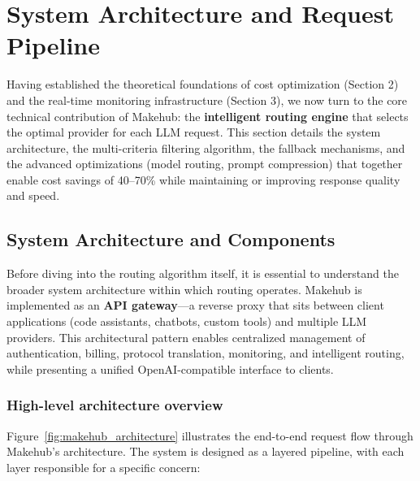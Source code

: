 \documentclass[english]{article}
\begin{document}
\newpage

\section{System Architecture and Request Pipeline}

Having established the theoretical foundations of cost optimization (Section 2) and the real-time monitoring infrastructure (Section 3), we now turn to the core technical contribution of Makehub: the \textbf{intelligent routing engine} that selects the optimal provider for each LLM request. This section details the system architecture, the multi-criteria filtering algorithm, the fallback mechanisms, and the advanced optimizations (model routing, prompt compression) that together enable cost savings of 40--70\% while maintaining or improving response quality and speed.

\subsection{System Architecture and Components}

Before diving into the routing algorithm itself, it is essential to understand the broader system architecture within which routing operates. Makehub is implemented as an \textbf{API gateway}—a reverse proxy that sits between client applications (code assistants, chatbots, custom tools) and multiple LLM providers. This architectural pattern enables centralized management of authentication, billing, protocol translation, monitoring, and intelligent routing, while presenting a unified OpenAI-compatible interface to clients.

\subsubsection{High-level architecture overview}

Figure~\ref{fig:makehub_architecture} illustrates the end-to-end request flow through Makehub's architecture. The system is designed as a layered pipeline, with each layer responsible for a specific concern:
\end{document}
